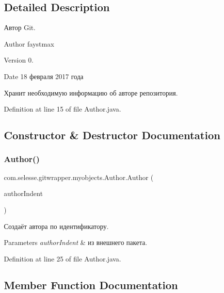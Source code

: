 \subsection{Detailed Description}
Автор Git. 

\begin{DoxyAuthor}{Author}
faystmax 
\end{DoxyAuthor}
\begin{DoxyVersion}{Version}
0. 
\end{DoxyVersion}
\begin{DoxyDate}{Date}
18 февраля 2017 года 
\end{DoxyDate}
Хранит необходимую информацию об авторе репозитория. 

Definition at line 15 of file Author.\+java.



\subsection{Constructor \& Destructor Documentation}
\mbox{\label{classcom_1_1selesse_1_1gitwrapper_1_1myobjects_1_1_author_aa61b57e3b7e08a4de3ad0359a33c8173}} 
\subsubsection{\texorpdfstring{Author()}{Author()}}
{\footnotesize\ttfamily com.\+selesse.\+gitwrapper.\+myobjects.\+Author.\+Author (\begin{DoxyParamCaption}\item[{Person\+Ident}]{author\+Indent }\end{DoxyParamCaption})}

Создаёт автора по идентификатору.


\begin{DoxyParams}{Parameters}
{\em author\+Indent} & из внешнего пакета. \\
\hline
\end{DoxyParams}


Definition at line 25 of file Author.\+java.



\subsection{Member Function Documentation}
\mbox{\label{classcom_1_1selesse_1_1gitwrapper_1_1myobjects_1_1_author_a6f6e946a4f8df76bdc01a52f0022f722}} 
